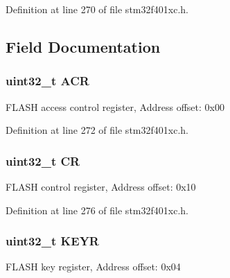 Definition at line 270 of file stm32f401xc.\+h.



\subsection{Field Documentation}
\subsubsection[{\texorpdfstring{A\+CR}{ACR}}]{ uint32\+\_\+t A\+CR}\hypertarget{struct_f_l_a_s_h___type_def_a9cb55206b29a8c16354747c556ab8bea}{}\label{struct_f_l_a_s_h___type_def_a9cb55206b29a8c16354747c556ab8bea}
F\+L\+A\+SH access control register, Address offset\+: 0x00 

Definition at line 272 of file stm32f401xc.\+h.

\subsubsection[{\texorpdfstring{CR}{CR}}]{ uint32\+\_\+t CR}\hypertarget{struct_f_l_a_s_h___type_def_ab40c89c59391aaa9d9a8ec011dd0907a}{}\label{struct_f_l_a_s_h___type_def_ab40c89c59391aaa9d9a8ec011dd0907a}
F\+L\+A\+SH control register, Address offset\+: 0x10 

Definition at line 276 of file stm32f401xc.\+h.

\subsubsection[{\texorpdfstring{K\+E\+YR}{KEYR}}]{ uint32\+\_\+t K\+E\+YR}\hypertarget{struct_f_l_a_s_h___type_def_a84c491be6c66b1d5b6a2efd0740b3d0c}{}\label{struct_f_l_a_s_h___type_def_a84c491be6c66b1d5b6a2efd0740b3d0c}
F\+L\+A\+SH key register, Address offset\+: 0x04 

